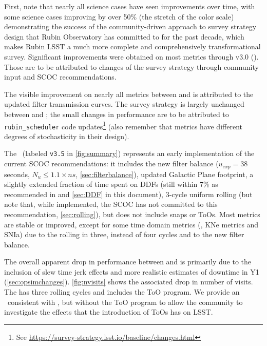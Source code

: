  First, note that nearly all science cases have seen improvements over time, with some science cases improving by over 50\% (the stretch of the color scale) demonstrating the success of the community-driven approach to survey strategy design that Rubin Observatory has committed to for the past decade, which makes Rubin LSST a much more complete and comprehensively transformational survey. Significant improvements were obtained on most metrics through v3.0 (). Those are to be attributed to changes of the survey strategy through community input and SCOC recommendations. 
 
 The visible improvement on nearly all metrics between  and  is attributed to the updated filter transmission curves. The survey strategy is largely unchanged between  and ; the small changes in performance are to be attributed to  \texttt{rubin\_scheduler} code updates\footnote{See \url{https://survey-strategy.lsst.io/baseline/changes.html}} (also remember that metrics have different degrees of stochasticity in their design). 
 
 The  \opsim\ (labeled \texttt{v3.5} in \autoref{fig:summary}) represents an early implementation of the current SCOC recommendations: it includes the new filter balance ($u_{exp}=38$ seconds, $N_u \leq1.1\times ns$, \autoref{sec:filterbalance}), updated Galactic Plane footprint, a slightly extended fraction of time spent on DDFs (still within 7\% as recommended in  and \autoref{sec:DDF} in this document), 3-cycle uniform rolling (but note that, while implemented, the SCOC has not committed to this recommendation, \autoref{sec:rolling}), but does not include snaps or ToOs. Most metrics are stable or improved, except for some time domain metrics (\eg, KNe metrics and SNIa) due to the rolling in three, instead of four cycles and to the new filter balance. 
 
 The overall apparent drop in performance between  and  is primarily due to the inclusion of slew time jerk effects and more realistic estimates of downtime in Y1 (\autoref{sec:opsimchanges}). \autoref{fig:nvisits} shows the associated drop in number of visits. The  has three rolling cycles and includes the ToO program. We provide an \opsim\ consistent with , but without the ToO program to allow the community to investigate the effects that the introduction of ToOs has on LSST. 
 
